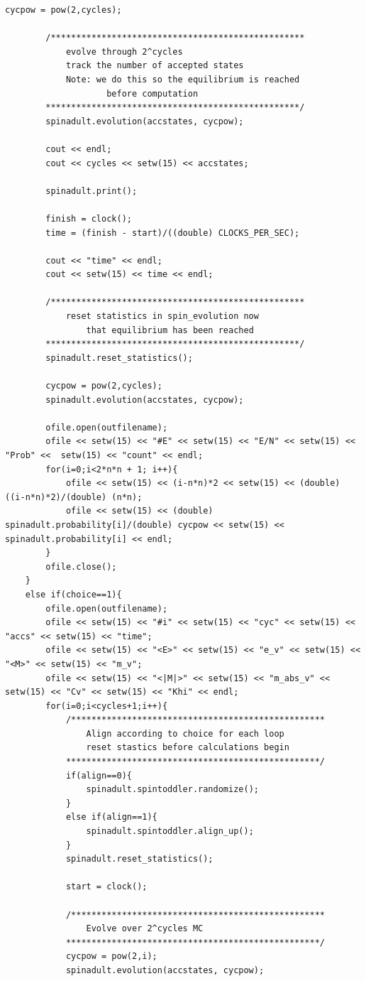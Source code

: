 \documentclass[11pt,a4paper]{article}
\begin{document}
\begin{lstlisting}[title={project4.cpp}]
		cycpow = pow(2,cycles);

		/**************************************************
			evolve through 2^cycles
			track the number of accepted states
			Note: we do this so the equilibrium is reached
					before computation
		**************************************************/
		spinadult.evolution(accstates, cycpow);

		cout << endl;
		cout << cycles << setw(15) << accstates;

		spinadult.print();

		finish = clock();
		time = (finish - start)/((double) CLOCKS_PER_SEC);

		cout << "time" << endl;
		cout << setw(15) << time << endl;

		/**************************************************
			reset statistics in spin_evolution now
				that equilibrium has been reached
		**************************************************/
		spinadult.reset_statistics();

		cycpow = pow(2,cycles);
		spinadult.evolution(accstates, cycpow);

		ofile.open(outfilename);
		ofile << setw(15) << "#E" << setw(15) << "E/N" << setw(15) << "Prob" <<  setw(15) << "count" << endl;
		for(i=0;i<2*n*n + 1; i++){
			ofile << setw(15) << (i-n*n)*2 << setw(15) << (double) ((i-n*n)*2)/(double) (n*n);
			ofile << setw(15) << (double) spinadult.probability[i]/(double) cycpow << setw(15) << spinadult.probability[i] << endl;
		}
		ofile.close();
	}
	else if(choice==1){
		ofile.open(outfilename);
		ofile << setw(15) << "#i" << setw(15) << "cyc" << setw(15) << "accs" << setw(15) << "time";
		ofile << setw(15) << "<E>" << setw(15) << "e_v" << setw(15) << "<M>" << setw(15) << "m_v";
		ofile << setw(15) << "<|M|>" << setw(15) << "m_abs_v" << setw(15) << "Cv" << setw(15) << "Khi" << endl;
		for(i=0;i<cycles+1;i++){
			/**************************************************
				Align according to choice for each loop
				reset stastics before calculations begin
			**************************************************/
			if(align==0){
				spinadult.spintoddler.randomize();
			}
			else if(align==1){
				spinadult.spintoddler.align_up();
			}
			spinadult.reset_statistics();

			start = clock();

			/**************************************************
				Evolve over 2^cycles MC
			**************************************************/
			cycpow = pow(2,i);
			spinadult.evolution(accstates, cycpow);


\end{lstlisting}
\end{document}
